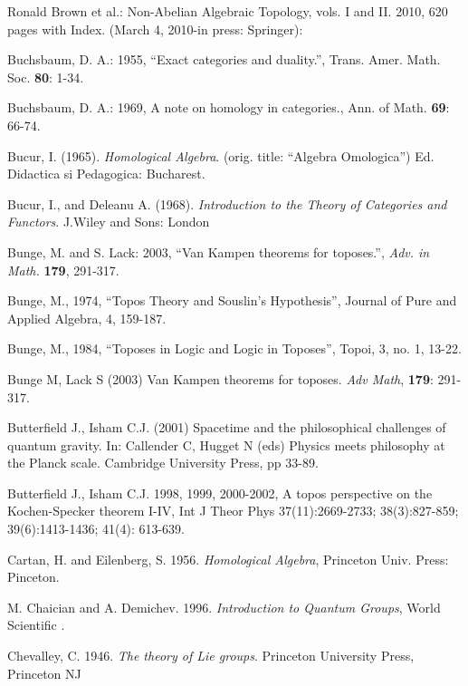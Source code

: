 \documentclass[12pt]{article}
\theoremstyle{plain}
\theoremstyle{definition}
\numberwithin{equation}{section}
\begin{document}
\begin{thebibliography}{99}
Ronald Brown et al.: Non-Abelian Algebraic Topology, vols. I and II. 2010, 620 pages with Index. (March 4, 2010-in press: Springer): 

Buchsbaum, D. A.: 1955, ``Exact categories and duality.'', Trans. Amer. Math. Soc. \textbf{80}: 1-34.

Buchsbaum, D. A.: 1969, A note on homology in categories., Ann. of Math. \textbf{69}: 66-74.

Bucur, I. (1965). {\em Homological Algebra}. (orig. title: ``Algebra Omologica'')
Ed. Didactica si Pedagogica: Bucharest.

Bucur, I., and Deleanu A. (1968). {\em  Introduction to the Theory of Categories and Functors}. J.Wiley and Sons: London

Bunge, M. and S. Lack: 2003, ``Van Kampen theorems for toposes.'', \emph{Adv. in Math.} \textbf{179}, 291-317.

Bunge, M., 1974, ``Topos Theory and Souslin's Hypothesis'', Journal of Pure and Applied Algebra, 4, 159-187.  

Bunge, M., 1984, ``Toposes in Logic and Logic in Toposes'', Topoi, 3, no. 1, 13-22. 

Bunge M, Lack S (2003) Van Kampen theorems for toposes. {\em Adv Math}, \textbf {179}: 291-317.

Butterfield J., Isham C.J. (2001) Spacetime and the philosophical challenges of quantum gravity. In:
Callender C, Hugget N (eds) Physics meets philosophy at the Planck scale. Cambridge University
Press, pp 33-89.

Butterfield J., Isham C.J. 1998, 1999, 2000-2002, A topos perspective on the Kochen-Specker theorem
I-IV, Int J Theor Phys 37(11):2669-2733; 38(3):827-859; 39(6):1413-1436; 41(4): 613-639.

Cartan, H. and Eilenberg, S. 1956. {\em Homological Algebra}, Princeton Univ. Press: Pinceton. 

M. Chaician and A. Demichev. 1996. {\em Introduction to Quantum Groups}, World Scientific .

Chevalley, C. 1946. {\em The theory of Lie groups}. Princeton University Press, Princeton NJ


\end{thebibliography}
\end{document}
